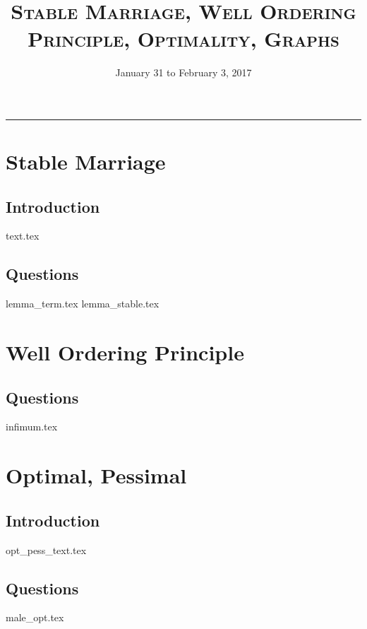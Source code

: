 \documentclass{exam}
\title{\textsc{Stable Marriage, Well Ordering Principle, Optimality, Graphs}}
\date{January 31 to February 3, 2017}
\begin{document}
\maketitle
\rule{\textwidth}{0.15em}
\fontsize{12}{15}\selectfont
\thispagestyle{empty}


\section{Stable Marriage}
\subsection{Introduction}
{text.tex}
\subsection{Questions}
\begin{questions}
{lemma_term.tex}
{lemma_stable.tex}
\end{questions}

\section{Well Ordering Principle}
\subsection{Questions}
\begin{questions}
{infimum.tex}
\end{questions}

\section{Optimal, Pessimal}
\subsection{Introduction}
{opt_pess_text.tex}
\subsection{Questions}
\begin{questions}
{male_opt.tex}
\end{questions}
\end{document}
